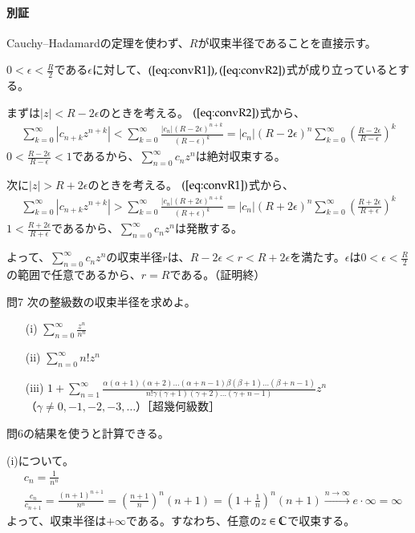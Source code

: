 \paragraph{別証}
Cauchy--Hadamardの定理を使わず、$R$が収束半径であることを直接示す。

$0<\epsilon<\frac{R}{2}$である$\epsilon$に対して、$(\ref{eq:convR1}),(\ref{eq:convR2})$式が成り立っているとする。

まずは$|z|<R-2\epsilon$のときを考える。
$(\ref{eq:convR2})$式から、
\begin{align*}
    \sum_{k=0}^\infty |c_{n+k}z^{n+k}|
    <\sum_{k=0}^\infty \frac{|c_n|(R-2\epsilon)^{n+k}}{(R-\epsilon)^k}=|c_n|(R-2\epsilon)^n\sum_{k=0}^\infty \left(\frac{R-2\epsilon}{R-\epsilon}\right)^k
\end{align*}
$0<\frac{R-2\epsilon}{R-\epsilon}<1$であるから、$\sum_{n=0}^\infty c_nz^n$は絶対収束する。

次に$|z|>R+2\epsilon$のときを考える。
$(\ref{eq:convR1})$式から、
\begin{align*}
    \sum_{k=0}^\infty |c_{n+k}z^{n+k}|
    >\sum_{k=0}^\infty \frac{|c_n|(R+2\epsilon)^{n+k}}{(R+\epsilon)^k}=|c_n|(R+2\epsilon)^n\sum_{k=0}^\infty \left(\frac{R+2\epsilon}{R+\epsilon}\right)^k
\end{align*}
$1<\frac{R+2\epsilon}{R+\epsilon}$であるから、$\sum_{n=0}^\infty c_nz^n$は発散する。

よって、$\sum_{n=0}^\infty c_nz^n$の収束半径$r$は、$R-2\epsilon<r<R+2\epsilon$を満たす。$\epsilon$は$0<\epsilon<\frac{R}{2}$の範囲で任意であるから、$r=R$である。（証明終）

\begin{mysimplebox}{問7}
    次の整級数の収束半径を求めよ。
    \begin{itemize}
        \item[(i)]{$\displaystyle\sum_{n=0}^{\infty}\frac{z^n}{n^n}$}
        \item[(ii)]{$\displaystyle\sum_{n=0}^{\infty}n!z^n$}
        \item[(iii)]{$\displaystyle 1+\sum_{n=1}^{\infty}\frac{\alpha(\alpha+1)(\alpha+2)\dots(\alpha+n-1)\beta(\beta+1)\dots(\beta+n-1)}{n!\gamma(\gamma+1)(\gamma+2)\dots(\gamma+n-1)}z^n$\\（$\gamma\neq 0, -1,-2,-3,\dots$）［超幾何級数］} 
    \end{itemize}
\end{mysimplebox}
問6の結果を使うと計算できる。

(i)について。
\begin{align*}
    &c_n=\frac{1}{n^n}\\
    &\frac{c_n}{c_{n+1}}=\frac{(n+1)^{n+1}}{n^n}=\left(\frac{n+1}{n}\right)^n(n+1)=\left(1+\frac{1}{n}\right)^n(n+1)\overset{n\longrightarrow\infty}{\longrightarrow}e\cdot \infty=\infty
\end{align*}
よって、収束半径は$+\infty$である。すなわち、任意の$z\in\mathbb{C}$で収束する。

